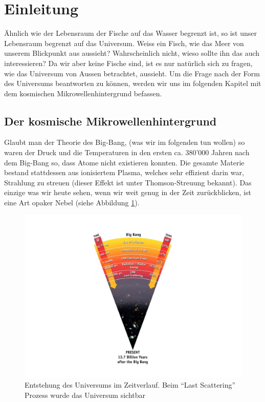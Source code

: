 \section{Einleitung}
Ähnlich wie der Lebensraum der Fische auf das Wasser begrenzt ist, so ist unser 
Lebensraum begrenzt auf das Universum.
Weiss ein Fisch, wie das Meer von unserem Blickpunkt aus aussieht?
Wahrscheinlich nicht, wieso sollte ihn das auch interessieren?
Da wir aber keine Fische sind, ist es nur natürlich sich zu fragen, wie das 
Universum von Aussen betrachtet, aussieht.
Um die Frage nach der Form des Universums beantworten zu können, werden wir uns 
im folgenden Kapitel mit dem kosmischen Mikrowellenhintergrund befassen.

\subsection{Der kosmische Mikrowellenhintergrund}
Glaubt man der Theorie des Big-Bang, (was wir im folgenden tun wollen) so waren 
der Druck und die Temperaturen in den ersten ca. 380'000 Jahren nach dem 
Big-Bang so, dass Atome nicht existieren konnten.
Die gesamte Materie bestand stattdessen aus ionisiertem Plasma, welches sehr 
effizient darin war, Strahlung zu streuen (dieser Effekt ist unter 
Thomson-Streuung bekannt).
Das einzige was wir heute sehen, wenn wir weit genug in der Zeit zurückblicken,
ist eine Art opaker Nebel (siehe Abbildung \ref{fig:radiation_scattering}).
\begin{figure}
	\centering
	\includegraphics[width=\linewidth]{cmb/images/radiation_scattering.jpg}
	\caption{Entstehung des Universums im Zeitverlauf. Beim ``Last Scattering'' 
	Prozess wurde das Universum sichtbar}
	\label{fig:radiation_scattering}
\end{figure}

